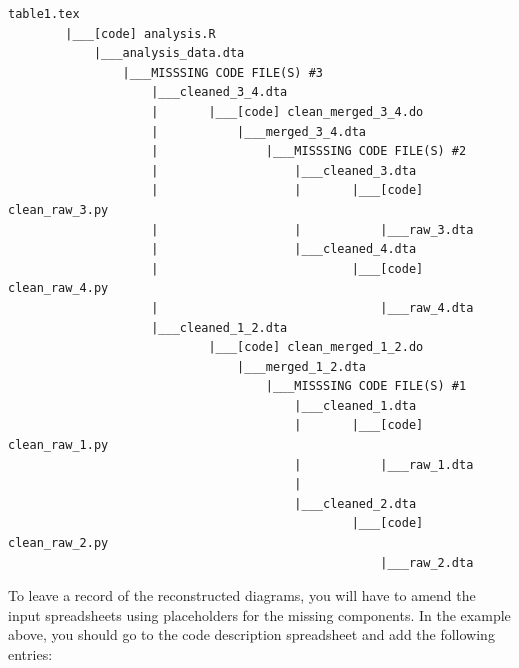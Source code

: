 \documentclass[]{book}
\begin{document}
\begin{verbatim}
table1.tex
        |___[code] analysis.R
            |___analysis_data.dta
                |___MISSSING CODE FILE(S) #3
                    |___cleaned_3_4.dta
                    |       |___[code] clean_merged_3_4.do
                    |           |___merged_3_4.dta
                    |               |___MISSSING CODE FILE(S) #2
                    |                   |___cleaned_3.dta
                    |                   |       |___[code] clean_raw_3.py
                    |                   |           |___raw_3.dta    
                    |                   |___cleaned_4.dta
                    |                           |___[code] clean_raw_4.py
                    |                               |___raw_4.dta
                    |___cleaned_1_2.dta
                            |___[code] clean_merged_1_2.do
                                |___merged_1_2.dta
                                    |___MISSSING CODE FILE(S) #1
                                        |___cleaned_1.dta
                                        |       |___[code] clean_raw_1.py
                                        |           |___raw_1.dta
                                        |   
                                        |___cleaned_2.dta
                                                |___[code] clean_raw_2.py
                                                    |___raw_2.dta
\end{verbatim}

To leave a record of the reconstructed diagrams, you will have to amend the input spreadsheets using placeholders for the missing components. In the example above, you should go to the code description spreadsheet and add the following entries:
\end{document}

